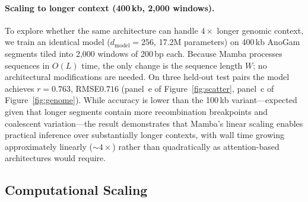 \documentclass{article}
\begin{document}
\paragraph{Scaling to longer context (400\,kb, 2{,}000 windows).}
To explore whether the same architecture can handle $4\times$ longer genomic context,
we train an identical model ($d_\mathrm{model} = 256$, 17.2M parameters) on 400\,kb
AnoGam segments tiled into 2{,}000 windows of 200\,bp each. Because Mamba processes
sequences in $O(L)$ time, the only change is the sequence length $W$; no architectural
modifications are needed. On three held-out test pairs the model achieves
$r = 0.763$, RMSE\;$0.716$ (panel~e of Figure~\ref{fig:scatter}, panel~c of
Figure~\ref{fig:genome}). While accuracy is lower than the 100\,kb variant---expected
given that longer segments contain more recombination breakpoints and coalescent
variation---the result demonstrates that Mamba's linear scaling enables practical
inference over substantially longer contexts, with wall time growing approximately
linearly (${\sim}4\times$) rather than quadratically as attention-based architectures
would require.

%
%

\subsection{Computational Scaling}
\end{document}
